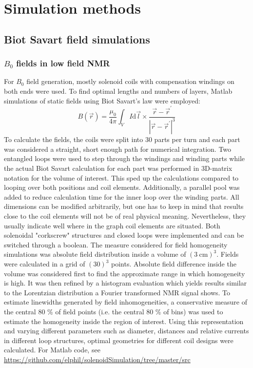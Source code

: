 \section{Simulation methods}\label{chapter:simulations}
\subsection{Biot Savart field simulations}
\subsubsection{$B_0$ fields in low field NMR}\label{simulations:B$_0$}
\label{sec:simulations:B0sim}
        For $B_0$ field generation, mostly solenoid coils with compensation windings on both ends were used. To find optimal lengths and numbers of layers, Matlab simulations of static fields using Biot Savart's law were employed:
        \begin{equation}
            B(\vec r) = \frac{\mu_0}{4\pi} \int_V I\mathrm{d} \vec l \times \frac{\vec r - \vec r^{'}}{\left|\vec r - \vec r^{'}\right|^3}
        \end{equation}
        To calculate the fields, the coils were split into 30 parts per turn and each part was considered a straight, short enough path for numerical integration. Two entangled loops were used to step through the windings and winding parts while the actual Biot Savart calculation for each part was performed in  3D-matrix notation for the volume of interest. This sped up the calculations compared to looping over both positions and coil elements. Additionally, a parallel pool was added to reduce calculation time for the inner loop over the winding parts.
        All dimensions can be modified arbitrarily, but one has to keep in mind that results close to the coil elements will not be of real physical meaning. Nevertheless, they usually indicate well where in the graph coil elements are situated.  Both solenoidal "corkscrew" structures and closed loops were implemented and can be switched through a boolean. The measure considered for field homogeneity simulations was absolute field distribution inside a volume of $(\SI{3}{\centi\meter})^3$. Fields were calculated in a grid of $(30)^3$ points. Absolute field difference inside the volume was considered first to find the approximate range in which homogeneity is high. It was then refined by a histogram evaluation which yields results similar to the Lorentzian distribution a Fourier transformed NMR signal shows. To estimate linewidths generated by field inhomogeneities, a conservative measure of the central 80 \% of field points (i.e. the central 80 \% of bins) was used to estimate the homogeneity inside the region of interest.  Using this representation and varying different parameters such as diameter, distances and relative currents in different loop structures, optimal geometries for different coil designs were calculated. For Matlab code, see \url{https://github.com/elphil/solenoidSimulation/tree/master/src}
